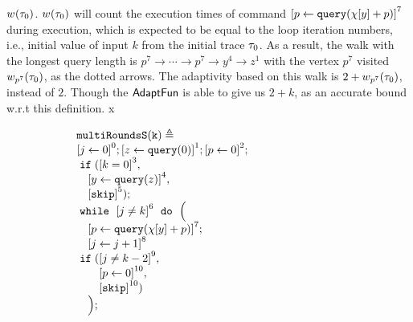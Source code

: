 \begin{example}
{    $w_{}(\mathtt{\tau}_0)$. $w_{}(\mathtt{\tau}_0)$ will count the execution times of command $\clabel{\assign{p}{\query(\chi[y]+p)} }^{7}$ during execution, which is expected to be equal to the loop iteration numbers, i.e., initial value of input $k$ from the initial trace $\mathtt{\tau}_0$.
    As a result, the walk with the longest query length 
    is
    $p^7  \to \cdots \to p^7 \to y^4  \to z^1 $ with the vertex $p^7$ visited $w_{p^7}(\mathtt{\tau}_0)$, as the dotted arrows. 
    The adaptivity based on this walk
    is $2 + w_{p^7}(\mathtt{\tau}_0)$, instead of $2$. 
    Though the $\textsf{AdaptFun}$ is able to give us $2 + k$,  as an accurate bound w.r.t this definition.
x}
        {\small
        \begin{figure}
            \centering
           \quad
           \begin{subfigure}{.35\textwidth}
           \begin{centering}
       {\footnotesize
           $ \begin{array}{l}
                   \kw{multiRoundsS(k)} \triangleq \\
                      \clabel{ \assign{j}{0}}^{0} ; 
                       \clabel{\assign{z}{\query(0)} }^{1} ;             
                       \clabel{\assign{p}{0} }^{2} ; \\
                       \eif(\clabel{ k = 0}^{3}, \\
                        \quad \clabel{ \assign{y}{\query(z)}}^{4}, \\
                        \quad \clabel{\eskip}^5);\\
                       \ewhile ~ \clabel{j \neq k}^{6} ~ \edo ~ \Big(
                        \\
                        \quad \clabel{\assign{p}{\query(\chi[y]+p)} }^{7}  ; \\
                        \quad \clabel{\assign{j}{j + 1}}^{8}\\
                        \eif(\clabel{ j \neq k - 2}^{9}, \\
                        \quad \quad \clabel{ \assign{p}{0}}^{10} ,\\ 
                        \quad \quad \clabel{\eskip}^{10})\\
                        \quad \Big);\\
                   \end{array}
           $       
       }
           \caption{}
           \end{centering}
           \end{subfigure}

\end{figure}}
\end{example}
